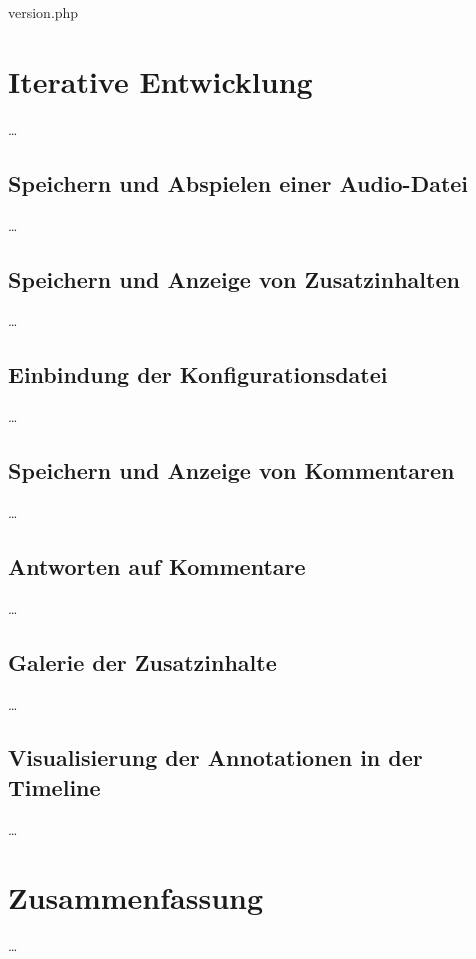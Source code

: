 version.php


\section{Iterative Entwicklung}
\dots

\subsection{Speichern und Abspielen einer Audio-Datei}
\dots

\subsection{Speichern und Anzeige von Zusatzinhalten}
\dots

\subsection{Einbindung der Konfigurationsdatei}
\dots

\subsection{Speichern und Anzeige von Kommentaren}
\dots

\subsection{Antworten auf Kommentare}
\dots

\subsection{Galerie der Zusatzinhalte}
\dots

\subsection{Visualisierung der Annotationen in der Timeline}
\dots

\section{Zusammenfassung}
\dots